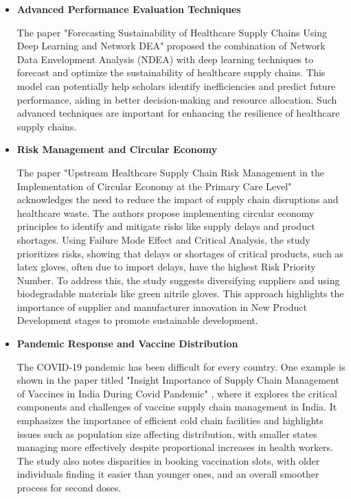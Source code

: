 \documentclass[12pt]{report}
\begin{document}
\begin{itemize}
  \item \textbf{Advanced Performance Evaluation Techniques}
  
  The paper "Forecasting Sustainability of Healthcare Supply Chains Using Deep Learning and Network DEA" \cite{ForcastDeepLearning} proposed the combination of Network Data Envelopment Analysis (NDEA) with deep learning techniques to forecast and optimize the sustainability of healthcare supply chains. This model can potentially help scholars identify inefficiencies and predict future performance, aiding in better decision-making and resource allocation. Such advanced techniques are important for enhancing the resilience of healthcare supply chains.
  
  \item \textbf{Risk Management and Circular Economy}
  
  The paper "Upstream Healthcare Supply Chain Risk Management in the Implementation of Circular Economy at the Primary Care Level" \cite{UpstreamRiskManagement} acknowledges the need to reduce the impact of supply chain disruptions and healthcare waste. The authors propose implementing circular economy principles to identify and mitigate risks like supply delays and product shortages. Using Failure Mode Effect and Critical Analysis, the study prioritizes risks, showing that delays or shortages of critical products, such as latex gloves, often due to import delays, have the highest Risk Priority Number. To address this, the study suggests diversifying suppliers and using biodegradable materials like green nitrile gloves. This approach highlights the importance of supplier and manufacturer innovation in New Product Development stages to promote sustainable development.
  
  \item \textbf{Pandemic Response and Vaccine Distribution}
  
  The COVID-19 pandemic has been difficult for every country. One example is shown in the paper titled "Insight Importance of Supply Chain Management of Vaccines in India During Covid Pandemic" \cite{IndiaCovid19Vacc}, where it explores the critical components and challenges of vaccine supply chain management in India. It emphasizes the importance of efficient cold chain facilities and highlights issues such as population size affecting distribution, with smaller states managing more effectively despite proportional increases in health workers. The study also notes disparities in booking vaccination slots, with older individuals finding it easier than younger ones, and an overall smoother process for second doses.
  

\end{itemize}
\end{document}
